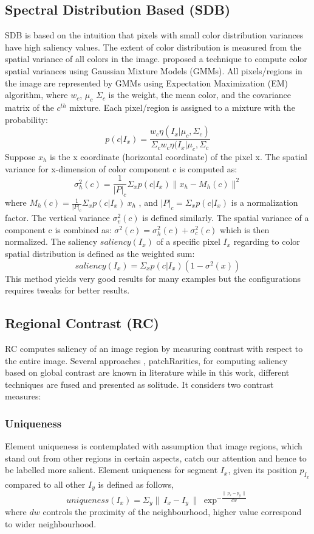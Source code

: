 \subsection{Spectral Distribution Based (SDB)} 
SDB is based on the intuition that pixels with small color distribution variances have high saliency values. The extent of color distribution is measured from the spatial variance of all colors in the image. \cite{spectralSal} proposed a technique to compute color spatial variances using Gaussian Mixture Models (GMMs). All pixels/regions in the image are represented by GMMs using Expectation Maximization (EM) algorithm, where $w_{c}$, $\mu_{c}$ $\Sigma_{c}$ is the weight, the mean color, and the covariance matrix of the $c^{th}$ mixture. Each pixel/region is assigned to a mixture with the probability:
$$p(c | I_{x}) = \frac{w_{c}\eta(I_{x}| \mu_{c},\Sigma_{c})}{\Sigma_{c}w_{c}\eta(I_{x}| \mu_{c},\Sigma_{c}} $$
Suppose $x_{h}$ is the x coordinate (horizontal coordinate) of the pixel x. The spatial variance for x-dimension of color component c is computed as:
$$\sigma_{h}^{2}(c) = \frac{1}{|P|_{c}}\Sigma_{x}	p(c | I_{x}) \parallel x_{h} -M_{h}(c) \parallel^{2}$$
where $M_{h}(c) = \frac{1}{|P|_{c}}\Sigma_{x}p(c|I_{x})~x_h$ , and $|P|_{c} = \Sigma_{x}p(c | I_{x})$ is a normalization factor. The vertical variance $\sigma_{v}^{2}(c)$ is defined similarly. The spatial variance of a component c is combined as: $\sigma^{2}(c) = \sigma_{h}^{2}(c) + \sigma_{c}^{2}(c)$ which is then normalized.
The saliency $saliency(I_{x})$ of a specific pixel $I_{x}$ regarding to color spatial
distribution is defined as the weighted sum:
$$saliency(I_{x}) = \Sigma_{x}p(c | I_{x})(1-\sigma^{2}(x))$$
This method yields very good results for many examples but the configurations requires tweaks for better results.

\subsection{Regional Contrast (RC)}
RC computes saliency of an image region by measuring contrast with respect to the entire image. Several approaches  \citep{globContrast}, {patchRarities}, \citep{salFilters} for computing saliency based on global contrast are known in literature while in this work, different techniques are fused and presented as solitude. It considers two contrast measures:
\subsubsection{Uniqueness}
Element uniqueness is contemplated with  assumption that image regions, which stand out from other regions in certain aspects, catch our attention and hence to be labelled more salient. Element uniqueness for segment $I_{x}$, given its position $p_{I_{x}}$ compared to all other $I_{y}$ is defined as follows,
$$uniqueness(I_{x}) = \Sigma_{y} \parallel~I_{x} -I_{y}~\parallel~\exp^{-\frac{\parallel~p_{x} - p_{y}~\parallel}{dw}}$$
where $dw$ controls the proximity of the neighbourhood, higher value correspond to wider neighbourhood.
